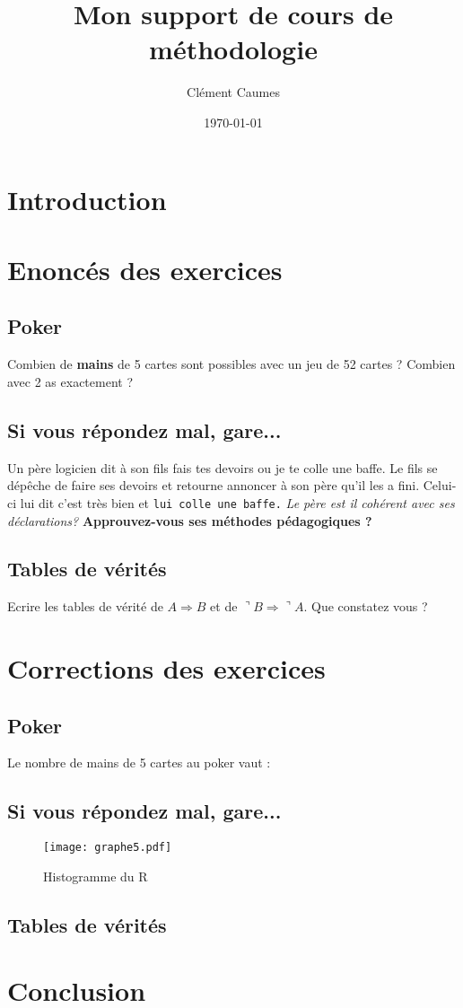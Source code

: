 \documentclass [a4]{article}
\author{Clément Caumes}
\title{Mon support de cours de méthodologie}
\date {\today}
\begin{document}
\maketitle 
\section{Introduction}
\section{Enoncés des exercices}
\subsection{Poker}
Combien de \textbf{mains} de 5 cartes sont possibles avec {\tiny un jeu} de 52 cartes ? Combien avec 2 as {\huge exactement} ?
\subsection{Si vous répondez mal, gare...}
Un père {\large logicien} dit à son fils \textsf{fais tes devoirs ou je te colle une baffe.} Le fils se dépêche de faire ses devoirs et retourne 
annoncer à son père qu'il les a fini. Celui-ci lui dit c'est très bien et \texttt{lui colle une baffe.} \textit{Le père est il cohérent avec ses déclarations?}
\textbf{Approuvez-vous ses méthodes pédagogiques ?}
\subsection{Tables de vérités}
Ecrire les tables de vérité de $A \Rightarrow B$ et de $\urcorner B \Rightarrow \urcorner A.$ Que constatez vous ?
\section{Corrections des exercices}
\subsection{Poker}
Le nombre de mains de 5 cartes au poker vaut : 

\subsection{Si vous répondez mal, gare...}
\begin{figure}[h]
\centering
\texttt{[image: graphe5.pdf]}
\caption{Histogramme du R}
\end{figure}
\subsection{Tables de vérités}

\section{Conclusion}
\end{document}
